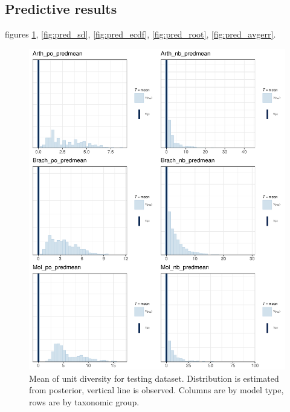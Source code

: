 \documentclass[12pt,letterpaper]{article}
\begin{document}
\subsection{Predictive results}
figures \ref{fig:pred_mean}, \ref{fig:pred_sd}, \ref{fig:pred_ecdf}, \ref{fig:pred_root}, \ref{fig:pred_avgerr}.

\afterpage{\clearpage}
\begin{figure}[h]
  \centering
  \includegraphics[width=\textwidth,height=0.8\textheight,keepaspectratio=true]{figure/pred_mean}
  \caption{Mean of unit diversity for testing dataset. Distribution is estimated from posterior, vertical line is observed. Columns are by model type, rows are by taxonomic group.}
  \label{fig:pred_mean}
\end{figure}
\end{document}
